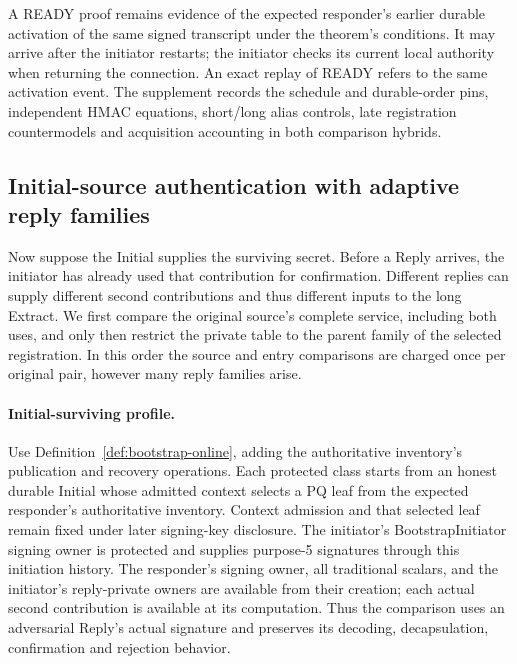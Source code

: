\documentclass[pdflatex]{sn-jnl}
\theoremstyle{thmstyleone}
\theoremstyle{thmstylethree}
\theoremstyle{thmstyletwo}
\begin{document}
A READY proof remains evidence of the expected responder's earlier
durable activation of the same signed transcript under the theorem's
conditions. It may arrive after the initiator restarts; the initiator
checks its current local authority when returning the connection.
An exact replay of READY refers to the same activation event. The supplement
records the schedule and durable-order pins, independent HMAC equations,
short/long alias controls, late registration countermodels and
acquisition accounting in both comparison hybrids.
\subsection{Initial-source authentication with adaptive reply families}
\label{sec:bootstrap-initial-source}

Now suppose the Initial supplies the surviving secret. Before a Reply
arrives, the initiator has already used that contribution for
confirmation. Different replies can supply different second
contributions and thus different inputs to the long Extract. We first
compare the original source's complete service, including both uses,
and only then restrict the private table to the parent family of the
selected registration. In this order the source and entry comparisons
are charged once per original pair, however many reply families arise.

\paragraph{Initial-surviving profile.}
Use Definition~\ref{def:bootstrap-online}, adding the authoritative
inventory's publication and recovery operations. Each protected class
starts from an honest durable Initial whose admitted context selects a
PQ leaf from the expected responder's authoritative inventory. Context
admission and that selected leaf remain fixed under later signing-key
disclosure. The initiator's BootstrapInitiator signing owner is protected
and supplies purpose-5 signatures through this initiation history. The
responder's signing owner, all traditional scalars, and the initiator's
reply-private owners are available from their creation; each actual
second contribution is available at its computation. Thus the comparison
uses an adversarial Reply's actual signature and preserves its decoding,
decapsulation, confirmation and rejection behavior.
\end{document}
